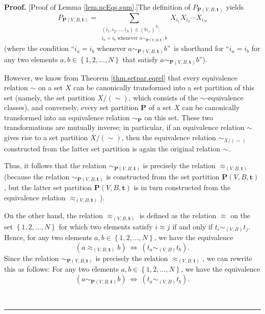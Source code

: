 \documentclass[numbers=enddot,12pt,final,onecolumn,notitlepage]{scrartcl}%
\theoremstyle{definition}
\newenvironment{proof}[1][Proof]{\noindent\textbf{#1.} }{\ \rule{0.5em}{0.5em}}
\newenvironment{vershort}{}{}
\let\sumnonlimits\sum
\renewcommand{\sum}{\sumnonlimits\limits}
\begin{document}
\begin{proof}
[Proof of Lemma \ref{lem.ncEqs.sum}.]The definition of $P_{\mathbf{P}\left(
V,B,\mathbf{t}\right)  }$ yields%
\begin{equation}
P_{\mathbf{P}\left(  V,B,\mathbf{t}\right)  }=\sum_{\substack{\left(
i_{1},i_{2},\ldots,i_{N}\right)  \in\left(  \mathbb{N}_{+}\right)
^{N};\\i_{a}=i_{b}\text{ whenever }a\sim_{\mathbf{P}\left(  V,B,\mathbf{t}%
\right)  }b}}X_{i_{1}}X_{i_{2}}\cdots X_{i_{N}} \label{pf.lem.ncEqs.sum.P=}%
\end{equation}
(where the condition \textquotedblleft$i_{a}=i_{b}$ whenever $a\sim
_{\mathbf{P}\left(  V,B,\mathbf{t}\right)  }b$\textquotedblright\ is shorthand
for \textquotedblleft$i_{a}=i_{b}$ for any two elements $a,b\in\left\{
1,2,\ldots,N\right\}  $ that satisfy $a\sim_{\mathbf{P}\left(  V,B,\mathbf{t}%
\right)  }b$\textquotedblright).

\begin{vershort}
However, we know from Theorem \ref{thm.setpar.eqrel} that every equivalence
relation $\sim$ on a set $X$ can be canonically transformed into a set
partition of this set (namely, the set partition $X/\left(  \sim\right)  $,
which consists of the $\sim$-equivalence classes), and conversely, every set
partition $\mathbf{P}$ of a set $X$ can be canonically transformed into an
equivalence relation $\sim_{\mathbf{P}}$ on this set. These two
transformations are mutually inverse; in particular, if an equivalence
relation $\sim$ gives rise to a set partition $X/\left(  \sim\right)  $, then
the equivalence relation $\sim_{X/\left(  \sim\right)  }$ constructed from the
latter set partition is again the original relation $\sim$.

Thus, it follows that the relation $\sim_{\mathbf{P}\left(  V,B,\mathbf{t}%
\right)  }$ is precisely the relation $\approx_{\left(  V,B,\mathbf{t}\right)
}$ (because the relation $\sim_{\mathbf{P}\left(  V,B,\mathbf{t}\right)  }$ is
constructed from the set partition $\mathbf{P}\left(  V,B,\mathbf{t}\right)
$, but the latter set partition $\mathbf{P}\left(  V,B,\mathbf{t}\right)  $ is
in turn constructed from the equivalence relation $\approx_{\left(
V,B,\mathbf{t}\right)  }$).

On the other hand, the relation $\approx_{\left(  V,B,\mathbf{t}\right)  }$ is
defined as the relation $\approx$ on the set $\left\{  1,2,\ldots,N\right\}  $
for which two elements satisfy $i\approx j$ if and only if $t_{i}\sim_{\left(
V,B\right)  }t_{j}$. Hence, for any two elements $a,b\in\left\{
1,2,\ldots,N\right\}  $, we have the equivalence%
\[
\left(  a\approx_{\left(  V,B,\mathbf{t}\right)  }b\right)
\ \Longleftrightarrow\ \left(  t_{a}\sim_{\left(  V,B\right)  }t_{b}\right)
.
\]
Since the relation $\sim_{\mathbf{P}\left(  V,B,\mathbf{t}\right)  }$ is
precisely the relation $\approx_{\left(  V,B,\mathbf{t}\right)  }$, we can
rewrite this as follows: For any two elements $a,b\in\left\{  1,2,\ldots
,N\right\}  $, we have the equivalence
\[
\left(  a\sim_{\mathbf{P}\left(  V,B,\mathbf{t}\right)  }b\right)
\ \Longleftrightarrow\ \left(  t_{a}\sim_{\left(  V,B\right)  }t_{b}\right)
.
\]



\end{vershort}
\end{proof}
\end{document}
